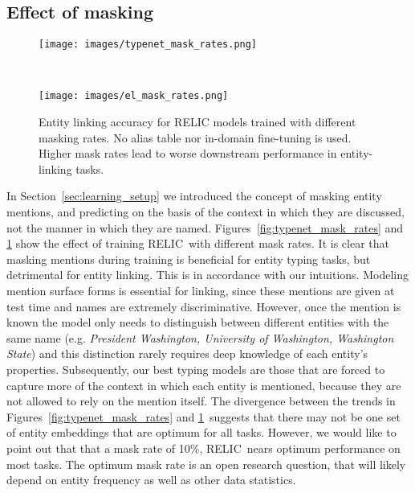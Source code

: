 \documentclass{article} \usepackage{iclr2020_conference,times}
\newcommand{\ack}{RELIC\xspace}
\begin{document}
\subsection{Effect of masking} \label{sec:masking_ablation}

\begin{figure}[t!]
    \centering
    \begin{minipage}{.45\textwidth}
        \centering
        \texttt{[image: images/typenet\_mask\_rates.png]}
        \caption{TypeNet entity-level typing mAP on the development set for \ack models trained with different masking rates. A higher mask rate leads to better performance, both in low and high-data situations.}
        \label{fig:typenet_mask_rates}
    \end{minipage}~~~~~~~~~~~~~~~~~~~~~
    \begin{minipage}{0.45\textwidth}
        \centering
        \texttt{[image: images/el\_mask\_rates.png]}
        \caption{Entity linking accuracy for \ack models trained with different masking rates. No alias table nor in-domain fine-tuning is used. Higher mask rates lead to worse downstream performance in entity-linking tasks.}
        \label{fig:el_mask_rates}
    \end{minipage}
\end{figure}

In Section~\ref{sec:learning_setup} we introduced the concept of masking entity mentions, and predicting on the basis of the context in which they are discussed, not the manner in which they are named. 
Figures~\ref{fig:typenet_mask_rates} and \ref{fig:el_mask_rates} show the effect of training \ack~with different mask rates. 
It is clear that masking mentions during training is beneficial for entity typing tasks, but detrimental for entity linking. 
This is in accordance with our intuitions. Modeling mention surface forms is essential for linking, since these mentions are given at test time and names are extremely discriminative. However, once the mention is known the model only needs to distinguish between different entities with the same name (e.g. {\it President Washington, University of Washington, Washington State}) and this distinction rarely requires deep knowledge of each entity's properties. Subsequently, our best typing models are those that are forced to capture more of the context in which each entity is mentioned, because they are not allowed to rely on the mention itself.
The divergence between the trends in Figures~\ref{fig:typenet_mask_rates} and \ref{fig:el_mask_rates}~suggests that there may not be one set of entity embeddings that are optimum for all tasks. However, we would like to point out that that a mask rate of 10\%, \ack~nears optimum performance on most tasks. The optimum mask rate is an open research question, that will likely depend on entity frequency as well as other data statistics.
\end{document}
